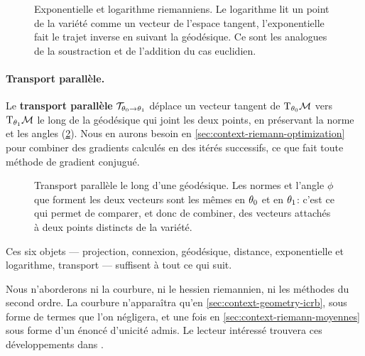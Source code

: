 \begin{figure}[htb]
  \centering
  
  \caption{Exponentielle et logarithme riemanniens. Le logarithme lit un point
    de la variété comme un vecteur de l'espace tangent, l'exponentielle fait le
    trajet inverse en suivant la géodésique. Ce sont les analogues de la
    soustraction et de l'addition du cas euclidien.}
  \label{fig:context-riemann-explog}
\end{figure}

\paragraph{Transport parallèle.} Le \textbf{transport parallèle} $\mathcal{T}_{\theta_0\to\theta_1}$ déplace un vecteur tangent de $\mathrm{T}_{\theta_0}\mathcal{M}$ vers $\mathrm{T}_{\theta_1}\mathcal{M}$ le long de la géodésique qui joint les deux points, en préservant la norme et les angles (\cref{fig:context-riemann-transport}). Nous en aurons besoin en \cref{sec:context-riemann-optimization} pour combiner des gradients calculés en des itérés successifs, ce que fait toute méthode de gradient conjugué.

\begin{figure}[htb]
  \centering
  
  \caption{Transport parallèle le long d'une géodésique. Les normes et l'angle
    $\phi$ que forment les deux vecteurs sont les mêmes en $\theta_0$ et en
    $\theta_1$: c'est ce qui permet de comparer, et donc de combiner, des
    vecteurs attachés à deux points distincts de la variété.}
  \label{fig:context-riemann-transport}
\end{figure}

Ces six objets --- projection, connexion, géodésique, distance, exponentielle et logarithme, transport --- suffisent à tout ce qui suit.

\begin{remark}
  Nous n'aborderons ni la courbure, ni le hessien riemannien, ni les méthodes du second ordre. La courbure n'apparaîtra qu'en \cref{sec:context-geometry-icrb}, sous forme de termes que l'on négligera, et une fois en \cref{sec:context-riemann-moyennes} sous forme d'un énoncé d'unicité admis. Le lecteur intéressé trouvera ces développements dans .
\end{remark}

